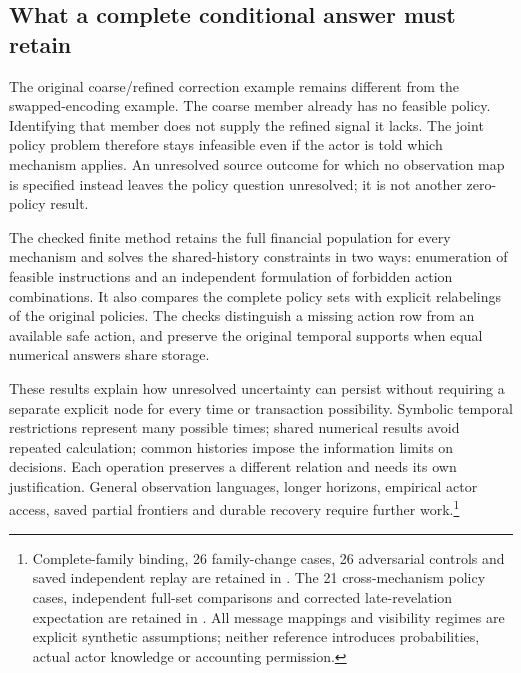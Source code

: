 \pagebreak
\subsection{What a complete conditional answer must retain}

The original coarse/refined correction example remains different from the swapped-encoding example. The coarse member already has no feasible policy. Identifying that member does not supply the refined signal it lacks. The joint policy problem therefore stays infeasible even if the actor is told which mechanism applies. An unresolved source outcome for which no observation map is specified instead leaves the policy question unresolved; it is not another zero-policy result.

The checked finite method retains the full financial population for every mechanism and solves the shared-history constraints in two ways: enumeration of feasible instructions and an independent formulation of forbidden action combinations. It also compares the complete policy sets with explicit relabelings of the original policies. The checks distinguish a missing action row from an available safe action, and preserve the original temporal supports when equal numerical answers share storage.

These results explain how unresolved uncertainty can persist without requiring a separate explicit node for every time or transaction possibility. Symbolic temporal restrictions represent many possible times; shared numerical results avoid repeated calculation; common histories impose the information limits on decisions. Each operation preserves a different relation and needs its own justification. General observation languages, longer horizons, empirical actor access, saved partial frontiers and durable recovery require further work.\footnote{Complete-family binding, 26 family-change cases, 26 adversarial controls and saved independent replay are retained in . The 21 cross-mechanism policy cases, independent full-set comparisons and corrected late-revelation expectation are retained in . All message mappings and visibility regimes are explicit synthetic assumptions; neither reference introduces probabilities, actual actor knowledge or accounting permission.}
